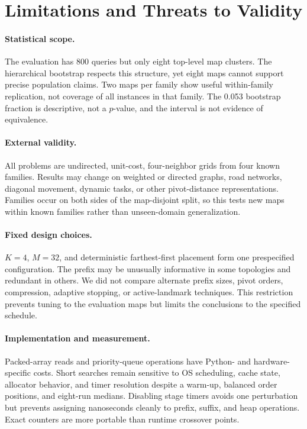 \section{Limitations and Threats to Validity}
\label{sec:limitations}

\paragraph{Statistical scope.}
The evaluation has 800 queries but only eight top-level map clusters.  The
hierarchical bootstrap respects this structure, yet eight maps cannot support
precise population claims.  Two maps per family show useful within-family
replication, not coverage of all instances in that family.  The 0.053
bootstrap fraction is descriptive, not a $p$-value, and the interval is not
evidence of equivalence.

\paragraph{External validity.}
All problems are undirected, unit-cost, four-neighbor grids from four known
families.  Results may change on weighted or directed graphs, road networks,
diagonal movement, dynamic tasks, or other pivot-distance representations.
Families occur on both sides of the map-disjoint split, so this tests new maps
within known families rather than unseen-domain generalization.

\paragraph{Fixed design choices.}
$K=4$, $M=32$, and deterministic farthest-first placement form one prespecified
configuration.  The prefix may be unusually informative in some topologies
and redundant in others.  We did not compare alternate prefix sizes, pivot
orders, compression, adaptive stopping, or active-landmark techniques.  This
restriction prevents tuning to the evaluation maps but limits the conclusions to
the specified schedule.

\paragraph{Implementation and measurement.}
Packed-array reads and priority-queue operations have Python- and
hardware-specific costs.  Short searches remain sensitive to OS scheduling,
cache state, allocator behavior, and timer resolution despite a warm-up,
balanced order positions, and eight-run medians.  Disabling stage timers
avoids one perturbation but prevents assigning nanoseconds cleanly to prefix,
suffix, and heap operations.  Exact counters are more portable than runtime
crossover points.

